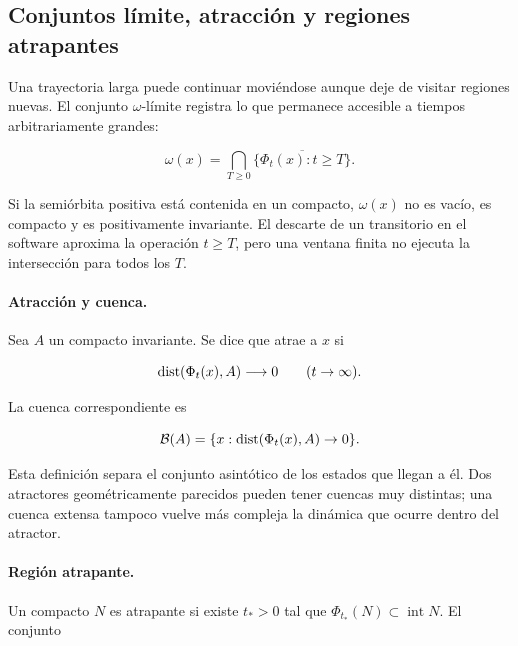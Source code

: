 
\subsection{Conjuntos límite, atracción y regiones atrapantes}

Una trayectoria larga puede continuar moviéndose aunque deje de visitar regiones
nuevas. El conjunto $\omega$-límite registra lo que permanece accesible a tiempos
arbitrariamente grandes:

\begin{equation}
 \omega(x)=\bigcap_{T\geq0}
 \overline{\{\Phi_t(x):t\geq T\}}.
 \label{eq:gt-omega}
\end{equation}

Si la semiórbita positiva está contenida en un compacto, $\omega(x)$ no es vacío,
es compacto y es positivamente invariante. El descarte de un transitorio en el
software aproxima la operación $t\geq T$, pero una ventana finita no ejecuta la
intersección para todos los $T$.

\paragraph{Atracción y cuenca.}
Sea $A$ un compacto invariante. Se dice que atrae a $x$ si

\begin{equation}
 \operatorname{dist}(\Phi_t(x),A)\longrightarrow0\qquad(t\to\infty).
 \label{eq:gt-atraccion}
\end{equation}

La cuenca correspondiente es

\begin{equation}
 \mathcal B(A)=\{x:\operatorname{dist}(\Phi_t(x),A)\to0\}.
 \label{eq:gt-cuenca}
\end{equation}

Esta definición separa el conjunto asintótico de los estados que llegan a él. Dos
atractores geométricamente parecidos pueden tener cuencas muy distintas; una cuenca
extensa tampoco vuelve más compleja la dinámica que ocurre dentro del atractor.

\paragraph{Región atrapante.}
Un compacto $N$ es atrapante si existe $t_*>0$ tal que
$\Phi_{t_*}(N)\subset\operatorname{int}N$. El conjunto

